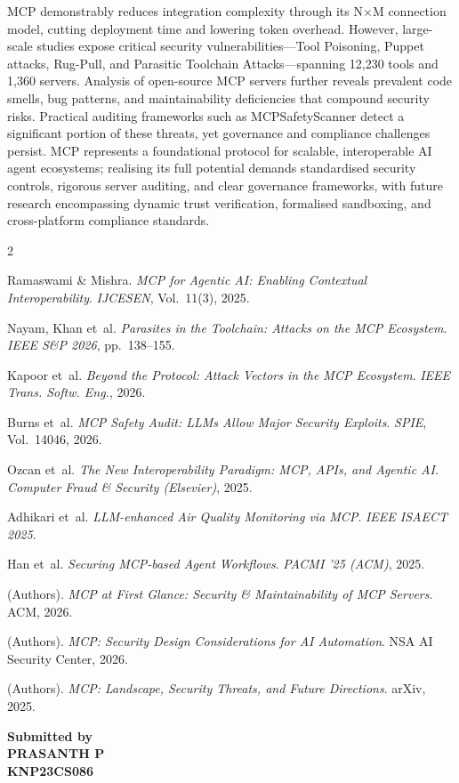 \documentclass[12pt,a4paper]{report}
\begin{document}
MCP demonstrably reduces integration complexity through its N$\times$M connection model, cutting deployment time and lowering token overhead. However, large-scale studies expose critical security vulnerabilities---Tool Poisoning, Puppet attacks, Rug-Pull, and Parasitic Toolchain Attacks---spanning 12,230 tools and 1,360 servers. Analysis of open-source MCP servers further reveals prevalent code smells, bug patterns, and maintainability deficiencies that compound security risks. Practical auditing frameworks such as MCPSafetyScanner detect a significant portion of these threats, yet governance and compliance challenges persist. MCP represents a foundational protocol for scalable, interoperable AI agent ecosystems; realising its full potential demands standardised security controls, rigorous server auditing, and clear governance frameworks, with future research encompassing dynamic trust verification, formalised sandboxing, and cross-platform compliance standards.

\vspace{0.25em}

\begin{multicols}{2}
\begin{enumerate}[leftmargin=1.5em, label={[\arabic*]}, itemsep=0pt, topsep=0pt]
\footnotesize\sloppy
  \item Ramaswami \& Mishra. \textit{MCP for Agentic AI: Enabling Contextual Interoperability}. \textit{IJCESEN}, Vol.~11(3), 2025.
  \item Nayam, Khan et~al. \textit{Parasites in the Toolchain: Attacks on the MCP Ecosystem}. \textit{IEEE S\&P 2026}, pp.~138--155.
  \item Kapoor et~al. \textit{Beyond the Protocol: Attack Vectors in the MCP Ecosystem}. \textit{IEEE Trans. Softw. Eng.}, 2026.
  \item Burns et~al. \textit{MCP Safety Audit: LLMs Allow Major Security Exploits}. \textit{SPIE}, Vol.~14046, 2026.
  \item Ozcan et~al. \textit{The New Interoperability Paradigm: MCP, APIs, and Agentic AI}. \textit{Computer Fraud \& Security (Elsevier)}, 2025.
  \item Adhikari et~al. \textit{LLM-enhanced Air Quality Monitoring via MCP}. \textit{IEEE ISAECT 2025}.
  \item Han et~al. \textit{Securing MCP-based Agent Workflows}. \textit{PACMI '25 (ACM)}, 2025.
  \item (Authors). \textit{MCP at First Glance: Security \& Maintainability of MCP Servers}. ACM, 2026.
  \item (Authors). \textit{MCP: Security Design Considerations for AI Automation}. NSA AI Security Center, 2026.
  \item (Authors). \textit{MCP: Landscape, Security Threats, and Future Directions}. arXiv, 2025.
\end{enumerate}
\end{multicols}

\begin{flushright}
{\small\textbf{Submitted by}\\[0.15em]
\textbf{PRASANTH P}\\[0.1em]
\textbf{KNP23CS086}}
\end{flushright}
\end{document}
